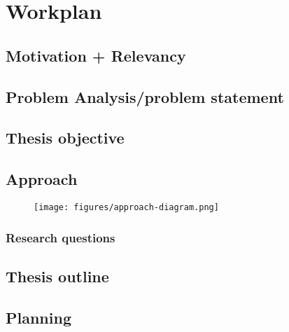 \chapter{Workplan}
\section{Motivation + Relevancy}

\section{Problem Analysis/problem statement}
\section{Thesis objective}
\section{Approach}

\begin{figure}
  \centering
  \texttt{[image: figures/approach-diagram.png]}
  \label{fig:work diagram}
\end{figure}

\subsection{Research questions}
\section{Thesis outline}
\section{Planning}